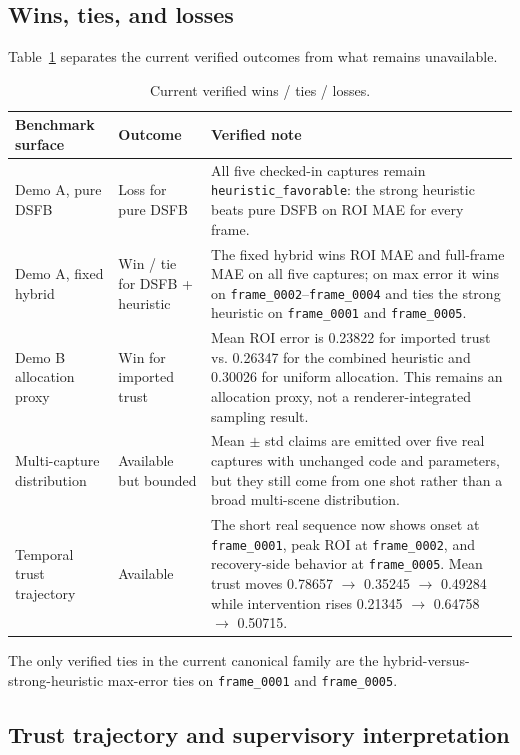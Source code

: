 \documentclass[11pt]{article}
\theoremstyle{definition}
\theoremstyle{plain}
\begin{document}
\subsection{Wins, ties, and losses}

Table~\ref{tab:wins-losses} separates the current verified outcomes from what remains unavailable.

\begin{table}[H]
\centering
\caption{Current verified wins / ties / losses.}
\label{tab:wins-losses}
\begin{tabular}{p{3.2cm} p{2.8cm} p{7.4cm}}
\toprule
Benchmark surface & Outcome & Verified note \\
\midrule
Demo A, pure DSFB & Loss for pure DSFB & All five checked-in captures remain \texttt{heuristic\_favorable}: the strong heuristic beats pure DSFB on ROI MAE for every frame. \\
Demo A, fixed hybrid & Win / tie for DSFB + heuristic & The fixed hybrid wins ROI MAE and full-frame MAE on all five captures; on max error it wins on \texttt{frame\_0002}--\texttt{frame\_0004} and ties the strong heuristic on \texttt{frame\_0001} and \texttt{frame\_0005}. \\
Demo B allocation proxy & Win for imported trust & Mean ROI error is 0.23822 for imported trust vs. 0.26347 for the combined heuristic and 0.30026 for uniform allocation. This remains an allocation proxy, not a renderer-integrated sampling result. \\
Multi-capture distribution & Available but bounded & Mean $\pm$ std claims are emitted over five real captures with unchanged code and parameters, but they still come from one shot rather than a broad multi-scene distribution. \\
Temporal trust trajectory & Available & The short real sequence now shows onset at \texttt{frame\_0001}, peak ROI at \texttt{frame\_0002}, and recovery-side behavior at \texttt{frame\_0005}. Mean trust moves 0.78657 $\rightarrow$ 0.35245 $\rightarrow$ 0.49284 while intervention rises 0.21345 $\rightarrow$ 0.64758 $\rightarrow$ 0.50715. \\
\bottomrule
\end{tabular}
\end{table}

The only verified ties in the current canonical family are the hybrid-versus-strong-heuristic max-error ties on \texttt{frame\_0001} and \texttt{frame\_0005}.

\subsection{Trust trajectory and supervisory interpretation}
\end{document}
